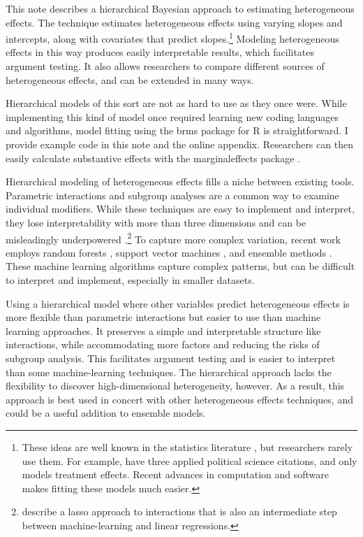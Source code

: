 \documentclass[12pt]{article}
\begin{document}

This note describes a hierarchical Bayesian approach to estimating heterogeneous effects. 
The technique estimates heterogeneous effects using varying slopes and intercepts, along with covariates that predict slopes.\footnote{These ideas are well known in the statistics literature \citep{FellerGelman2015}, but researchers rarely use them. For example, \citet{FellerGelman2015} have three applied political science citations, and only \citet{Marquardt2022} models treatment effects. Recent advances in computation and software makes fitting these models much easier.} 
Modeling heterogeneous effects in this way produces easily interpretable results, which facilitates argument testing. 
It also allows researchers to compare different sources of heterogeneous effects, and can be extended in many ways.  


Hierarchical models of this sort are not as hard to use as they once were. 
While implementing this kind of model once required learning new coding languages and algorithms, model fitting using the brms package for \textsf{R} is straightforward. 
I provide example code in this note and the online appendix.
Researchers can then easily calculate substantive effects with the marginaleffects package \citep{ArelBundockme}.


Hierarchical modeling of heterogeneous effects fills a niche between existing tools.
Parametric interactions and subgroup analyses are a common way to examine individual modifiers. 
While these techniques are easy to implement and interpret, they lose interpretability with more than three dimensions and can be misleadingly underpowered \citep{Simmonsetal2011}.\footnote{\citet{BlackwellOlson2022} describe a lasso approach to interactions that is also an intermediate step between machine-learning and linear regressions.}
To capture more complex variation, recent work employs random forests \citep{GreenKern2012, WagerAthey2018}, support vector machines \citep{ImaiRatkovic2013}, and ensemble methods \citep{Grimmeretal2017, Kuenzeletal2019, Dorieetal2022}.
These machine learning algorithms capture complex patterns, but can be difficult to interpret and implement, especially in smaller datasets. 

 
Using a hierarchical model where other variables predict heterogeneous effects is more flexible than parametric interactions but easier to use than machine learning approaches.  
It preserves a simple and interpretable structure like interactions, while accommodating more factors and reducing the risks of subgroup analysis. 
This facilitates argument testing and is easier to interpret than some machine-learning techniques.
The hierarchical approach lacks the flexibility to discover high-dimensional heterogeneity, however.  
As a result, this approach is best used in concert with other heterogeneous effects techniques, and could be a useful addition to ensemble models. 
\end{document}
